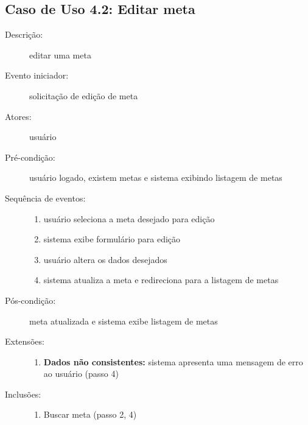 \subsection{Caso de Uso 4.2: Editar meta}
\begin{description}
	\item[Descrição:] editar uma meta
	\item[Evento iniciador:] solicitação de edição de meta
	\item[Atores:] usuário
	\item[Pré-condição:] usuário logado, existem metas e sistema exibindo listagem de metas
	\item[Sequência de eventos:] \hfill
		\begin{enumerate}
			\item{usuário seleciona a meta desejado para edição}
			\item{sistema exibe formulário para edição}
			\item{usuário altera os dados desejados}
			\item{sistema atualiza a meta e redireciona para a listagem de metas}
		\end{enumerate}
	\item[Pós-condição:] meta atualizada e sistema exibe listagem de metas
	\item[Extensões:] \hfill
		\begin{enumerate}
			\item{\textbf{Dados não consistentes:} sistema apresenta uma mensagem de erro ao usuário (passo 4)}
		\end{enumerate}
	\item[Inclusões:] \hfill
		\begin{enumerate}
			\item{Buscar meta (passo 2, 4)}
		\end{enumerate}
\end{description}
%
